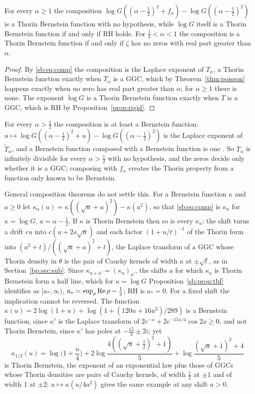 \begin{proposition}\label{sb:prop:tbf}
For every $\alpha\ge1$ the composition $\log G((\alpha-\frac12)^2+f_\alpha)-\log G((\alpha-\frac12)^2)$ is a Thorin Bernstein function with no hypothesis, while $\log G$ itself is a Thorin Bernstein function if and only if RH holds. For $\frac12<\alpha<1$ the composition is a Thorin Bernstein function if and only if $\zeta$ has no zeros with real part greater than $\alpha$.
\end{proposition}

\begin{proof}
By \eqref{sb:eq:comp} the composition is the Laplace exponent of $T_\alpha$, a Thorin Bernstein function exactly when $T_\alpha$ is a GGC, which by Theorem~\ref{thm:poisson} happens exactly when no zero has real part greater than $\alpha$; for $\alpha\ge1$ there is none. The exponent $\log G$ is a Thorin Bernstein function exactly when $T$ is a GGC, which is RH by Proposition~\ref{prop:rigid}.
\end{proof}

For every $\alpha>\frac12$ the composition is at least a Bernstein function: $u\mapsto\log G((\alpha-\frac12)^2+u)-\log G((\alpha-\frac12)^2)$ is the Laplace exponent of $\widetilde T_\alpha$, and a Bernstein function composed with a Bernstein function is one \cite[Corollary 3.8]{boSSV}. So $T_\alpha$ is infinitely divisible for every $\alpha>\frac12$ with no hypothesis, and the zeros decide only whether it is a GGC; composing with $f_\alpha$ creates the Thorin property from a function only known to be Bernstein.

General composition theorems do not settle this. For a Bernstein function $\kappa$ and $a\ge0$ let $\kappa_a(u)=\kappa((\sqrt u+a)^2)-\kappa(a^2)$, so that \eqref{sb:eq:comp} is $\kappa_a$ for $\kappa=\log G$, $a=\alpha-\frac12$. If $\kappa$ is Thorin Bernstein then so is every $\kappa_a$: the shift turns a drift $cu$ into $c(u+2a\sqrt u)$ and each factor $(1+u/t)^{-1}$ of the Thorin form into $(a^2+t)/((\sqrt u+a)^2+t)$, the Laplace transform of a GGC whose Thorin density in $\theta$ is the pair of Cauchy kernels of width $a$ at $\pm\sqrt t$, as in Section~\ref{bp:sec:sub}. Since $\kappa_{a+a'}=(\kappa_a)_{a'}$, the shifts $a$ for which $\kappa_a$ is Thorin Bernstein form a half line, which for $\kappa=\log G$ Proposition~\ref{sb:prop:tbf} identifies as $[a_*,\infty)$, $a_*=\sup_\rho\operatorname{Re}\rho-\frac12$; RH is $a_*=0$. For a fixed shift the implication cannot be reversed. The function $\kappa(u)=2\log(1+u)+\log(1+(120u+16u^2)/289)$ is a Bernstein function, since $\kappa'$ is the Laplace transform of $2e^{-x}+2e^{-15x/4}\cos2x\ge0$, and not Thorin Bernstein, since $\kappa'$ has poles at $-\frac{15}4\pm2i$; yet
\[
\kappa_{1/2}(u)=\log\Big(1+\frac u4\Big)+2\log\frac{4((\sqrt u+\frac12)^2+1)}5+\log\frac{(\sqrt u+1)^2+4}5
\]
is Thorin Bernstein, the exponent of an exponential law plus those of GGCs whose Thorin densities are pairs of Cauchy kernels, of width $\frac12$ at $\pm1$ and of width $1$ at $\pm2$; $u\mapsto\kappa(u/4a^2)$ gives the same example at any shift $a>0$.

